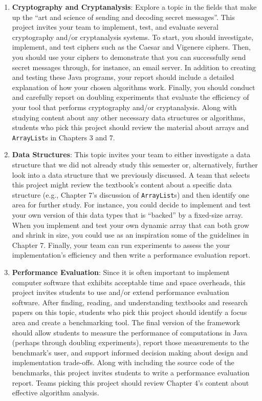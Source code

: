 \documentclass[11pt]{article}
\newcommand{\program}[1]{\lstinline{#1}}
\begin{document}
\begin{enumerate}

  \item {\bf Cryptography and Cryptanalysis}: Explore a topic in the fields that
    make up the ``art and science of sending and decoding secret messages''.
    This project invites your team to implement, test, and evaluate several
    cryptography and/or cryptanalysis systems. To start, you should investigate,
    implement, and test ciphers such as the Caesar and Vigenere ciphers. Then,
    you should use your ciphers to demonstrate that you can successfully send
    secret messages through, for instance, an email server. In addition to
    creating and testing these Java programs, your report should include a
    detailed explanation of how your chosen algorithms work. Finally, you should
    conduct and carefully report on doubling experiments that evaluate the
    efficiency of your tool that performs cryptography and/or cryptanalysis.
    Along with studying content about any other necessary data structures or
    algorithms, students who pick this project should review the material about
    arrays and \program{ArrayList}s in Chapters 3 and 7.

  \item {\bf Data Structures}: This topic invites your team to either
    investigate a data structure that we did not already study this semester or,
    alternatively, further look into a data structure that we previously
    discussed. A team that selects this project might review the textbook's
    content about a specific data structure (e.g., Chapter 7's discussion of
    \program{ArrayList}s) and then identify one area for further study. For
    instance, you could decide to implement and test your own version of this
    data types that is ``backed'' by a fixed-size array. When you implement and
    test your own dynamic array that can both grow and shrink in size, you could
    use as an inspiration some of the guidelines in Chapter 7. Finally, your
    team can run experiments to assess the your implementation's efficiency and
    then write a performance evaluation report.

  \item {\bf Performance Evaluation}: Since it is often important to implement
    computer software that exhibits acceptable time and space overheads, this
    project invites students to use and/or extend performance evaluation
    software. After finding, reading, and understanding textbooks and research
    papers on this topic, students who pick this project should identify a focus
    area and create a benchmarking tool. The final version of the framework
    should allow students to measure the performance of computations in Java
    (perhaps through doubling experiments), report those measurements to the
    benchmark's user, and support informed decision making about design and
    implementation trade-offs. Along with including the source code of the
    benchmarks, this project invites students to write a performance evaluation
    report. Teams picking this project should review Chapter 4's content about
    effective algorithm analysis.


\end{enumerate}
\end{document}
